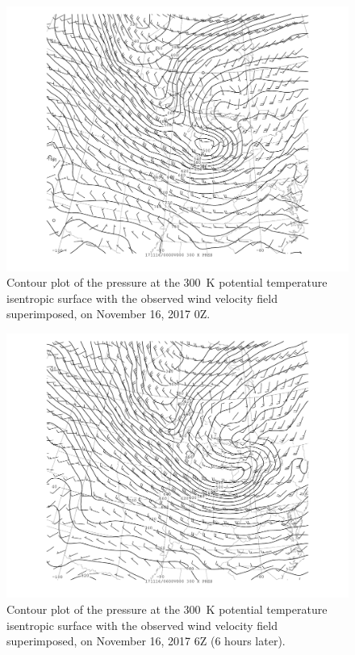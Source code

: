 \documentclass[11pt]{article}
\begin{document}
\begin{figure}[h!]
  \centering
  \includegraphics[width=\textwidth,trim={2.5cm 1cm 2.5cm 0},clip]{thta_pres_field_MI_0Z}
  \caption{Contour plot of the pressure at the \SI{300}{\K} potential temperature isentropic surface with the observed wind velocity field superimposed, on November 16, 2017 0Z.}
  \label{fig:thta_pres_field_MI_0Z}
\end{figure}

\begin{figure}[h!]
  \centering
  \includegraphics[width=\textwidth,trim={2.5cm 1cm 2.5cm 0},clip]{thta_pres_field_MI_6Z}
  \caption{Contour plot of the pressure at the \SI{300}{\K} potential temperature isentropic surface with the observed wind velocity field superimposed, on November 16, 2017 6Z (6 hours later).}
  \label{fig:thta_pres_field_MI_6Z}
\end{figure}

\end{document}
